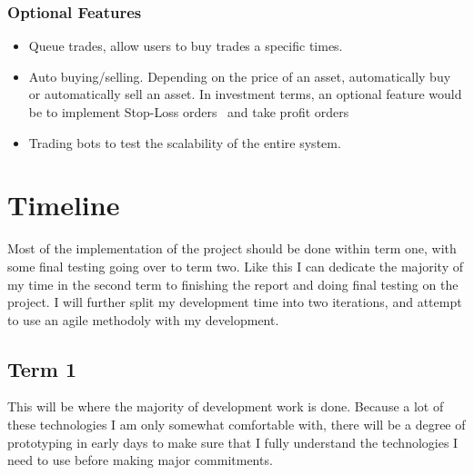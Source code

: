 \documentclass[titlepage]{article}
\begin{document}
\subsubsection{Optional Features}
\begin{itemize}
	\item Queue trades, allow users to buy trades a specific times.
	\item Auto buying/selling. Depending on the price of an asset, automatically buy or automatically sell an asset. In investment terms, an optional feature would be to implement Stop-Loss orders~\cite{stop_loss} and  take profit orders~\cite{take_profit}
  \item Trading bots to test the scalability of the entire system.
\end{itemize}

\pagebreak

\section{Timeline}
Most of the implementation of the project should be done within term one, with some final testing going over to term two. Like this I can dedicate the majority of my time in the second term to finishing the report and doing final testing on the project. I will further split my development time into two iterations, and attempt to use an agile methodoly with my development.

\subsection{Term 1}
This will be where the majority of development work is done. Because a lot of these technologies I am only somewhat comfortable with, there will be a degree of prototyping in early days to make sure that I fully understand the technologies I need to use before making major commitments.
\end{document}
